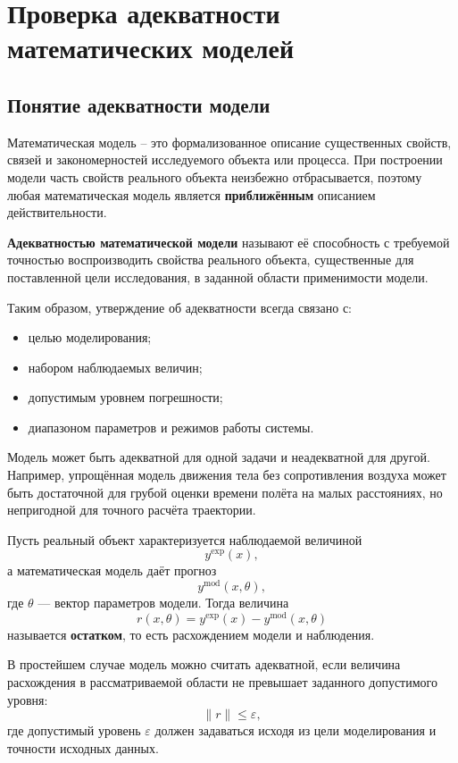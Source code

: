 \section{Проверка адекватности математических моделей}

\subsection{Понятие адекватности модели}

Математическая модель -- это формализованное описание существенных свойств, связей и закономерностей исследуемого объекта или процесса. При построении модели часть свойств реального объекта неизбежно отбрасывается, поэтому любая математическая модель является \textbf{приближённым} описанием действительности.

\textbf{Адекватностью математической модели} называют её способность с требуемой точностью воспроизводить свойства реального объекта, существенные для поставленной цели исследования, в заданной области применимости модели.

Таким образом, утверждение об адекватности всегда связано с:
\begin{itemize}
	\item целью моделирования;
	\item набором наблюдаемых величин;
	\item допустимым уровнем погрешности;
	\item диапазоном параметров и режимов работы системы.
\end{itemize}

Модель может быть адекватной для одной задачи и неадекватной для другой. Например, упрощённая модель движения тела без сопротивления воздуха может быть достаточной для грубой оценки времени полёта на малых расстояниях, но непригодной для точного расчёта траектории.

Пусть реальный объект характеризуется наблюдаемой величиной
\[
y^{\mathrm{exp}}(x),
\]
а математическая модель даёт прогноз
\[
y^{\mathrm{mod}}(x,\theta),
\]
где $\theta$ --- вектор параметров модели. Тогда величина
\[
r(x,\theta)=y^{\mathrm{exp}}(x)-y^{\mathrm{mod}}(x,\theta)
\]
называется \textbf{остатком}, то есть расхождением модели и наблюдения.

В простейшем случае модель можно считать адекватной, если величина расхождения в рассматриваемой области не превышает заданного допустимого уровня:
\[
\|r\|\leq\varepsilon,
\]
где допустимый уровень $\varepsilon$ должен задаваться исходя из цели моделирования и точности исходных данных.

